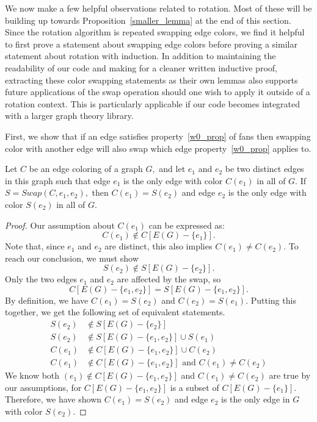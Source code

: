 We now make a few helpful observations related to rotation. Most of these will be building up towards Proposition~\ref{smaller_lemma} at the end of this section. Since the rotation algorithm is repeated swapping edge colors, we find it helpful to first prove a statement about swapping edge colors before proving a similar statement about rotation with induction. In addition to maintaining the readability of our code and making for a cleaner written inductive proof, extracting these color swapping statements as their own lemmas also supports future applications of the swap operation should one wish to apply it outside of a rotation context. This is particularly applicable if our code becomes integrated with a larger graph theory library. 

First, we show that if an edge satisfies property~\ref{w0_prop} of fans then swapping color with another edge will also swap which edge property~\ref{w0_prop} applies to.
\begin{lemma}\label{swap_w0}
    Let $C$ be an edge coloring of a graph $G,$ and let $e_1$ and $e_2$ be two distinct edges in this graph such that edge $e_1$ is the only edge with color $C(e_1)$ in all of $G.$ If $S = Swap(C, e_1, e_2),$ then $C(e_1) = S(e_2)$ and edge $e_2$ is the only edge with color $S(e_2)$ in all of $G.$
\end{lemma}
\begin{proof}
    Our assumption about $C(e_1)$ can be expressed as:
    $$C(e_1) \notin C[E(G) - \{e_1\}].$$
    Note that, since $e_1$ and $e_2$ are distinct, this also implies $C(e_1) \neq C(e_2).$
    To reach our conclusion, we must show 
    $$S(e_2) \notin S[E(G) - \{e_2\}].$$
    Only the two edges $e_1$ and $e_2$ are affected by the swap, so $$C[E(G) - \{e_1, e_2\}] = S[E(G) - \{e_1, e_2\}].$$
    By definition, we have $C(e_1) = S(e_2)$ and $C(e_2) = S(e_1).$ Putting this together, we get the following set of equivalent statements.
    \begin{align*}
        S(e_2) &\notin S[E(G) - \{e_2\}]\\
        S(e_2) &\notin S[E(G) - \{e_1, e_2\}] \cup S(e_1)\\
        C(e_1) &\notin C[E(G) - \{e_1, e_2\}] \cup C(e_2)\\
        C(e_1) &\notin C[E(G) - \{e_1, e_2\}] \text{ and } C(e_1) \neq C(e_2)
    \end{align*}
    We know both $(e_1) \notin C[E(G) - \{e_1, e_2\}]$ and $C(e_1)  \neq C(e_2)$ are true by our assumptions, for $C[E(G) - \{e_1, e_2\}]$ is a subset of $C[E(G) - \{e_1\}].$ Therefore, we have shown $C(e_1) = S(e_2)$ and edge $e_2$ is the only edge in $G$ with color $S(e_2).$
\end{proof}

